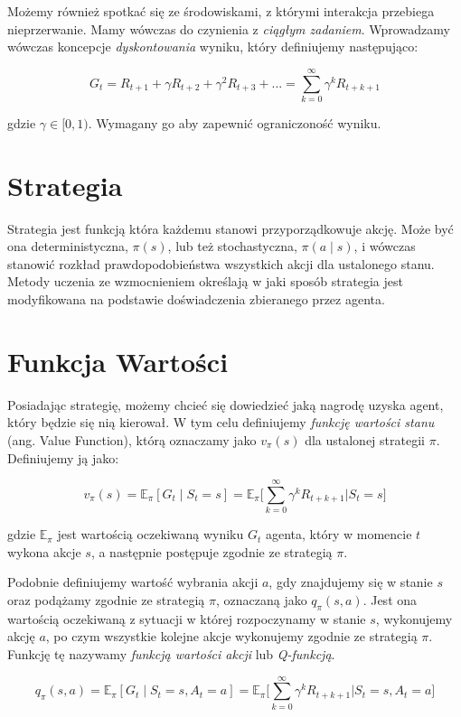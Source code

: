 \documentclass[licencjacka]{pracamgr}
\begin{document}
Możemy również spotkać się ze środowiskami, z którymi interakcja przebiega nieprzerwanie. Mamy wówczas do czynienia z \emph{ciągłym zadaniem}. Wprowadzamy wówczas koncepcje \emph{dyskontowania} wyniku, który definiujemy następująco:

$$ G_t = R_{t+1} + \gamma R_{t+2} + \gamma^2 R_{t+3} + ... = 
\sum_{k=0}^{\infty} \gamma^k R_{t+k+1} $$

gdzie $ \gamma \in [0, 1) $. Wymagany go aby zapewnić ograniczoność wyniku.


\section{Strategia}

Strategia jest funkcją która każdemu stanowi przyporządkowuje akcję. Może być ona deterministyczna, $ \pi(s) $, lub też stochastyczna, $ \pi(a \mid s) $, i wówczas stanowić rozkład prawdopodobieństwa wszystkich akcji dla ustalonego stanu. Metody uczenia ze wzmocnieniem określają w jaki sposób strategia jest modyfikowana na podstawie doświadczenia zbieranego przez agenta.

\section{Funkcja Wartości}

Posiadając strategię, możemy chcieć się dowiedzieć jaką nagrodę uzyska agent, który będzie się nią kierował. W tym celu definiujemy \emph{funkcję wartości stanu} (ang. Value Function), którą oznaczamy jako $ v_{\pi}(s) $ dla ustalonej strategii $ \pi $. Definiujemy ją jako:

$$ v_{\pi}(s) = \mathbb{E}_{\pi}[G_t \mid S_t = s] = \mathbb{E}_{\pi} \Bigg[ \sum_{k=0}^{\infty} \gamma^k R_{t+k+1} \bigg| S_t = s \Bigg] $$

gdzie $ \mathbb{E}_{\pi} $ jest wartością oczekiwaną wyniku $ G_t $ agenta, który w momencie $t$ wykona akcje $s$, a następnie postępuje zgodnie ze strategią $\pi$.

Podobnie definiujemy wartość wybrania akcji $a$, gdy znajdujemy się w stanie $s$ oraz podążamy zgodnie ze strategią $\pi$, oznaczaną jako $q_{\pi}(s, a)$. Jest ona wartością oczekiwaną z sytuacji w której rozpoczynamy w stanie $s$, wykonujemy akcję $a$, po czym wszystkie kolejne akcje wykonujemy zgodnie ze strategią $\pi$. Funkcję tę nazywamy \emph{funkcją wartości akcji} lub \emph{Q-funkcją}.

$$ q_{\pi}(s, a) = \mathbb{E}_{\pi}[G_t \mid S_t = s, A_t = a] = \mathbb{E}_{\pi} \Bigg[ \sum_{k=0}^{\infty} \gamma^k R_{t+k+1} \bigg| S_t = s, A_t = a \Bigg] $$
\end{document}
